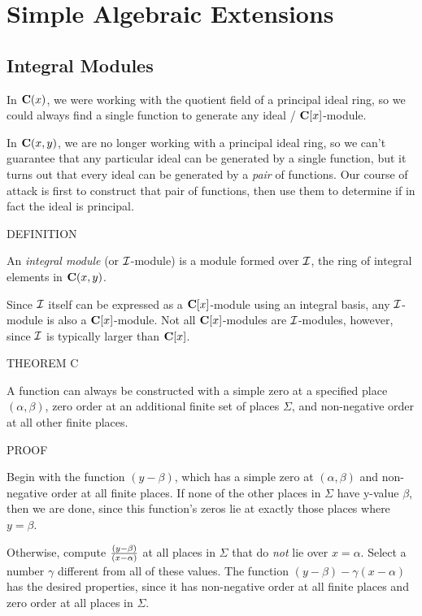 
\setcounter{chapter}{8}
\chapter{Simple Algebraic Extensions}

\section{Integral Modules}

In ${\bf C}(x)$, we were working with the quotient field of a
principal ideal ring, so we could always find a single function to
generate any ideal / ${\bf C}[x]$-module.

In ${\bf C}(x,y)$, we are no longer working with a principal ideal
ring, so we can't guarantee that any particular ideal can be generated
by a single function, but it turns out that every ideal can be
generated by a {\it pair} of functions.  Our course of attack is first
to construct that pair of functions, then use them to determine if in
fact the ideal is principal.

DEFINITION

An {\it integral module} (or ${\cal I}$-module) is a module formed
over ${\cal I}$, the ring of integral elements in ${\bf C}(x,y)$.

Since ${\cal I}$ itself can be expressed as a ${\bf C}[x]$-module
using an integral basis, any ${\cal I}$-module is also a ${\bf
C}[x]$-module.  Not all ${\bf C}[x]$-modules are ${\cal I}$-modules,
however, since ${\cal I}$ is typically larger than ${\bf C}[x]$.

THEOREM C

A function can always be constructed with a simple zero at a specified
place $(\alpha, \beta)$, zero order at an additional finite set of
places $\Sigma$, and non-negative order at all other finite places.

PROOF

Begin with the function $(y-\beta)$, which has a simple zero at
$(\alpha, \beta)$ and non-negative order at all finite places.  If
none of the other places in $\Sigma$ have y-value $\beta$, then we are
done, since this function's zeros lie at exactly those places where $y
= \beta$.

Otherwise, compute $(y-\beta)\over(x-\alpha)$ at all places in $\Sigma$
that do {\it not} lie over $x = \alpha$.  Select a number
$\gamma$ different from all of these values.  The function
$(y-\beta) - \gamma (x-\alpha)$ has the desired properties, since
it has non-negative order at all finite places and zero order at
all places in $\Sigma$.

